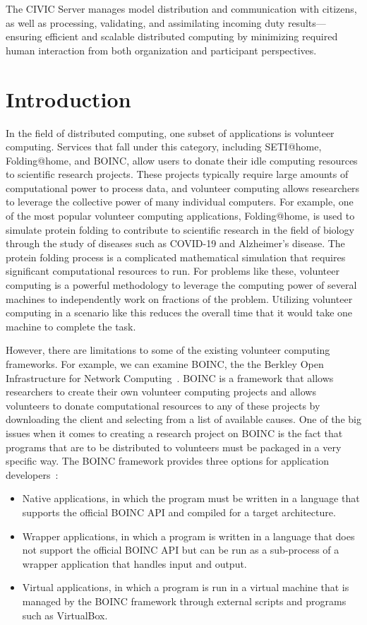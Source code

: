 \documentclass[11pt]{article}
\begin{document}
The CIVIC Server manages model distribution and communication with citizens, as well as processing, validating, and assimilating incoming duty results---ensuring efficient and scalable distributed computing by minimizing required human interaction from both organization and participant perspectives.


\section{Introduction}

In the field of distributed computing, one subset of applications is volunteer computing. Services that fall under this category, including SETI@home, Folding@home, and BOINC, allow users to donate their idle computing resources to scientific research projects. These projects typically require large amounts of computational power to process data, and volunteer computing allows researchers to leverage the collective power of many individual computers. For example, one of the most popular volunteer computing applications, Folding@home, is used to simulate protein folding to contribute to scientific research in the field of biology through the study of diseases such as COVID-19 and Alzheimer's disease. The protein folding process is a complicated mathematical simulation that requires significant computational resources to run. For problems like these, volunteer computing is a powerful methodology to leverage the computing power of several machines to independently work on fractions of the problem. Utilizing volunteer computing in a scenario like this reduces the overall time that it would take one machine to complete the task.

However, there are limitations to some of the existing volunteer computing frameworks. For example, we can examine BOINC, the the Berkley Open Infrastructure for Network Computing~\cite{Anderson2020}. BOINC is a framework that allows researchers to create their own volunteer computing projects and allows volunteers to donate computational resources to any of these projects by downloading the client and selecting from a list of available causes. One of the big issues when it comes to creating a research project on BOINC is the fact that programs that are to be distributed to volunteers must be packaged in a very specific way. The BOINC framework provides three options for application developers~\cite{boincAppsIntro}:

\begin{itemize}
    \item Native applications, in which the program must be written in a language that supports the official BOINC API and compiled for a target architecture.
    \item Wrapper applications, in which a program is written in a language that does not support the official BOINC API but can be run as a sub-process of a wrapper application that handles input and output.
    \item Virtual applications, in which a program is run in a virtual machine that is managed by the BOINC framework through external scripts and programs such as VirtualBox.
\end{itemize}
\end{document}
